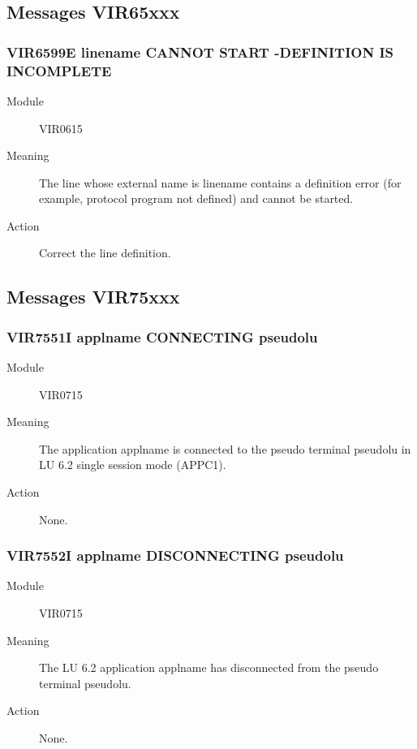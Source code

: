 \documentclass[letterpaper,10pt,english]{sphinxmanual}
\begin{document}
\subsection{Messages VIR65xxx}
\label{\detokenize{messages:messages-vir65xxx}}

\subsubsection{VIR6599E linename CANNOT START -DEFINITION IS INCOMPLETE}
\label{\detokenize{messages:vir6599e-linename-cannot-start-definition-is-incomplete}}\begin{description}
\item[{Module}] \leavevmode
VIR0615

\item[{Meaning}] \leavevmode
The line whose external name is linename contains a definition error (for example, protocol program not defined) and cannot be started.

\item[{Action}] \leavevmode
Correct the line definition.

\end{description}


\subsection{Messages VIR75xxx}
\label{\detokenize{messages:messages-vir75xxx}}

\subsubsection{VIR7551I applname CONNECTING pseudolu}
\label{\detokenize{messages:vir7551i-applname-connecting-pseudolu}}\begin{description}
\item[{Module}] \leavevmode
VIR0715

\item[{Meaning}] \leavevmode
The application applname is connected to the pseudo terminal pseudolu in LU 6.2 single session mode (APPC1).

\item[{Action}] \leavevmode
None.

\end{description}


\subsubsection{VIR7552I applname DISCONNECTING pseudolu}
\label{\detokenize{messages:vir7552i-applname-disconnecting-pseudolu}}\begin{description}
\item[{Module}] \leavevmode
VIR0715

\item[{Meaning}] \leavevmode
The LU 6.2 application applname has disconnected from the pseudo terminal pseudolu.

\item[{Action}] \leavevmode
None.

\end{description}
\end{document}
